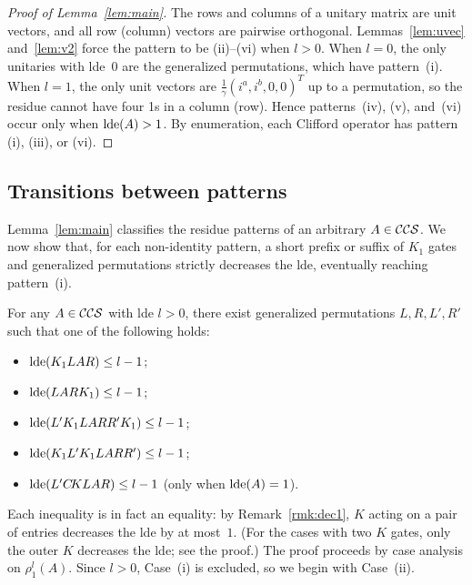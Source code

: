 \documentclass[reprint,amsmath,amssymb,aps,pra]{revtex4-2}
\begin{document}
\begin{proof}[Proof of Lemma~\ref{lem:main}]
  The rows and columns of a unitary matrix are unit vectors, and all
  row (column) vectors are pairwise orthogonal. Lemmas~\ref{lem:uvec}
  and~\ref{lem:v2} force the pattern to be (ii)--(vi) when $l>0$. When
  $l=0$, the only unitaries with lde~0 are the generalized
  permutations, which have pattern~(i). When $l=1$, the only unit
  vectors are $\frac{1}{\gamma}(i^a,i^b,0,0)^T$ up to a permutation,
  so the residue cannot have four 1s in a column (row). Hence
  patterns~(iv), (v), and~(vi) occur only when $\operatorname{lde}(A)>1$. By
  enumeration, each Clifford operator has pattern (i), (iii), or (vi).
\end{proof}

\subsection{Transitions between patterns}

Lemma~\ref{lem:main} classifies the residue patterns of an arbitrary
$A \in {\mathcal{CCS}}$. We now show that, for each non-identity pattern,
a short prefix or suffix of $K_1$ gates and generalized permutations
strictly decreases the lde, eventually reaching pattern~(i).

\begin{lemma}\label{lem:main2}
  For any $A \in {\mathcal{CCS}}$ with lde $l>0$, there exist generalized
  permutations $L,R,L',R'$ such that one of the following holds:
  \begin{itemize}
  \item $\operatorname{lde}(K_1LAR) \le l-1$;
  \item $\operatorname{lde}(LARK_1)\le l-1$;
  \item $\operatorname{lde}(L'K_1LARR'K_1)\le l-1$;
  \item $\operatorname{lde}(K_1L'K_1LARR')\le l-1$;
  \item $\operatorname{lde}(L'C\kern-.16667em K LAR)\le l-1$ (only when $\operatorname{lde}(A) = 1$).
  \end{itemize}
\end{lemma}
Each inequality is in fact an equality: by Remark~\ref{rmk:dec1}, $K$
acting on a pair of entries decreases the lde by at most~$1$. (For the
cases with two $K$ gates, only the outer $K$ decreases the lde; see
the proof.) The proof proceeds by case analysis on $\rho_1^l(A)$.
Since $l>0$, Case~(i) is excluded, so we begin with Case~(ii).
\end{document}
